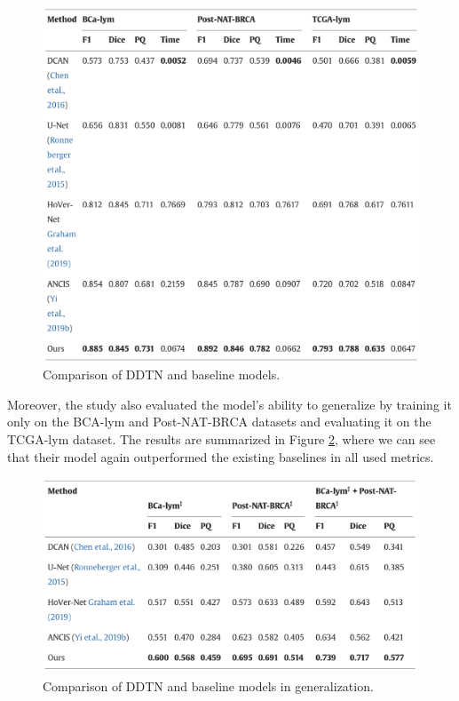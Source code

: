 \begin{figure}[H]
    \begin{centering}
    \includegraphics[width=14cm]{assets/images/rw-ddtn-results.png}
    \par\end{centering}
    \caption{Comparison of DDTN and baseline models.}
    \label{fig:rw-ddtn-results}
\end{figure}

Moreover, the study also evaluated the model's ability to generalize by training it only on the BCA-lym and Post-NAT-BRCA datasets and evaluating it on the TCGA-lym dataset. The results are summarized in Figure \ref{fig:rw-ddtn-generalize}, where we can see that their model again outperformed the existing baselines in all used metrics.

\begin{figure}[H]
    \begin{centering}
    \includegraphics[width=14cm]{assets/images/rw-ddtn-generalize.png}
    \par\end{centering}
    \caption{Comparison of DDTN and baseline models in generalization.}
    \label{fig:rw-ddtn-generalize}
\end{figure}

